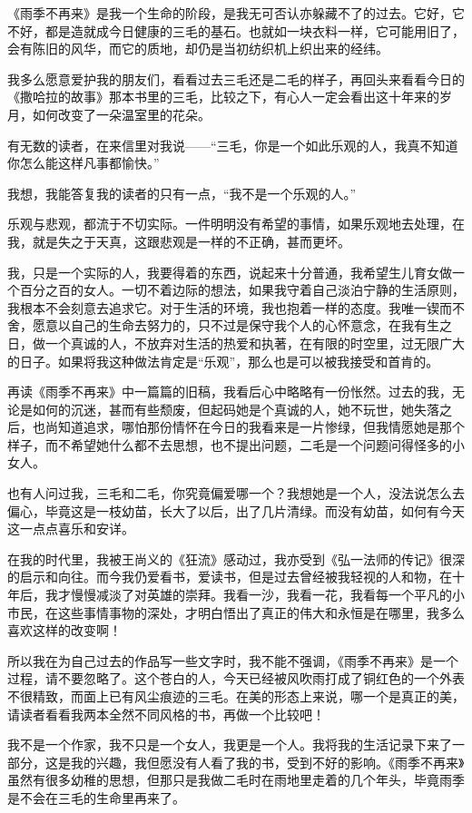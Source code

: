 \par 《雨季不再来》是我一个生命的阶段，是我无可否认亦躲藏不了的过去。它好，它不好，都是造就成今日健康的三毛的基石。也就如一块衣料一样，它可能用旧了，会有陈旧的风华，而它的质地，却仍是当初纺织机上织出来的经纬。
\par 我多么愿意爱护我的朋友们，看看过去三毛还是二毛的样子，再回头来看看今日的《撒哈拉的故事》那本书里的三毛，比较之下，有心人一定会看出这十年来的岁月，如何改变了一朵温室里的花朵。
\par 有无数的读者，在来信里对我说——“三毛，你是一个如此乐观的人，我真不知道你怎么能这样凡事都愉快。”
\par 我想，我能答复我的读者的只有一点，“我不是一个乐观的人。”
\par 乐观与悲观，都流于不切实际。一件明明没有希望的事情，如果乐观地去处理，在我，就是失之于天真，这跟悲观是一样的不正确，甚而更坏。
\par 我，只是一个实际的人，我要得着的东西，说起来十分普通，我希望生儿育女做一个百分之百的女人。一切不着边际的想法，如果我守着自己淡泊宁静的生活原则，我根本不会刻意去追求它。对于生活的环境，我也抱着一样的态度。我唯一锲而不舍，愿意以自己的生命去努力的，只不过是保守我个人的心怀意念，在我有生之日，做一个真诚的人，不放弃对生活的热爱和执著，在有限的时空里，过无限广大的日子。如果将我这种做法肯定是“乐观”，那么也是可以被我接受和首肯的。
\par 再读《雨季不再来》中一篇篇的旧稿，我看后心中略略有一份怅然。过去的我，无论是如何的沉迷，甚而有些颓废，但起码她是个真诚的人，她不玩世，她失落之后，也尚知道追求，哪怕那份情怀在今日的我看来是一片惨绿，但我情愿她是那个样子，而不希望她什么都不去思想，也不提出问题，二毛是一个问题问得怪多的小女人。
\par 也有人问过我，三毛和二毛，你究竟偏爱哪一个？我想她是一个人，没法说怎么去偏心，毕竟这是一枝幼苗，长大了以后，出了几片清绿。而没有幼苗，如何有今天这一点点喜乐和安详。
\par 在我的时代里，我被王尚义的《狂流》感动过，我亦受到《弘一法师的传记》很深的启示和向往。而今我仍爱看书，爱读书，但是过去曾经被我轻视的人和物，在十年后，我才慢慢减淡了对英雄的崇拜。我看一沙，我看一花，我看每一个平凡的小市民，在这些事情事物的深处，才明白悟出了真正的伟大和永恒是在哪里，我多么喜欢这样的改变啊！
\par 所以我在为自己过去的作品写一些文字时，我不能不强调，《雨季不再来》是一个过程，请不要忽略了。这个苍白的人，今天已经被风吹雨打成了铜红色的一个外表不很精致，而面上已有风尘痕迹的三毛。在美的形态上来说，哪一个是真正的美，请读者看看我两本全然不同风格的书，再做一个比较吧！
\par 我不是一个作家，我不只是一个女人，我更是一个人。我将我的生活记录下来了一部分，这是我的兴趣，我但愿没有人看了我的书，受到不好的影响。《雨季不再来》虽然有很多幼稚的思想，但那只是我做二毛时在雨地里走着的几个年头，毕竟雨季是不会在三毛的生命里再来了。
